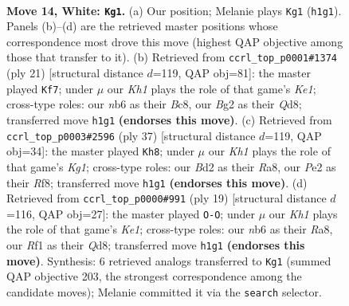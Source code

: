 \documentclass[11pt]{article}
\begin{document}
\begin{figure}[p]
\label{fig:thought-m24}
\end{figure}

\clearpage

\begin{figure}[p]\centering
\begin{subfigure}{0.46\textwidth}\centering
\resizebox{\linewidth}{!}{%
\newchessgame
\chessboard[
  setfen={r1b1kb1r/1pp5/1nn3p1/4p2p/p4P1q/2NP4/PP1BPPB1/R2QNR1K w kq - 0 14},
  showmover=false,
  pgfstyle=straightmove, color=movearrow, markmove={h1-g1}
]}
\caption{}
\end{subfigure}\hfill
\begin{subfigure}{0.46\textwidth}\centering
\resizebox{\linewidth}{!}{%
\newchessgame
\chessboard[
  setfen={r1bqk2r/ppp1n1pp/5n2/3P4/Q1p1p3/2P1N1P1/P3PP1P/R1B1KB1R b KQkq - 2 11},
  showmover=false,
  pgfstyle=straightmove, color=movearrow, markmove={e8-f7}
]}
\caption{}
\end{subfigure}
\\[4pt]
\begin{subfigure}{0.46\textwidth}\centering
\resizebox{\linewidth}{!}{%
\newchessgame
\chessboard[
  setfen={r4rk1/ppq1n1p1/2nb3p/3p1p1b/3P4/PQ3N1P/1P1BNPP1/RB2RK2 b - - 0 19},
  showmover=false,
  pgfstyle=straightmove, color=movearrow, markmove={g8-h8}
]}
\caption{}
\end{subfigure}\hfill
\begin{subfigure}{0.46\textwidth}\centering
\resizebox{\linewidth}{!}{%
\newchessgame
\chessboard[
  setfen={r1bqk2r/1p1n1ppp/1bp4n/p3p1N1/P1B1P3/1N5P/1PP2PP1/R1BQK2R b KQkq - 0 10},
  showmover=false,
  pgfstyle=straightmove, color=movearrow, markmove={e8-g8}
]}
\caption{}
\end{subfigure}
\caption{\textbf{Move 14, White: \texttt{Kg1}.} (a) Our position; Melanie plays \texttt{Kg1} (\texttt{h1g1}). Panels (b)--(d) are the retrieved master positions whose correspondence most drove this move (highest QAP objective among those that transfer to it). (b) Retrieved from \texttt{ccrl\_top\_p0001\#1374} (ply 21) [structural distance $d$=119, QAP obj=81]: the master played \texttt{Kf7}; under $\mu$ our \emph{Kh1} plays the role of that game's \emph{Ke1}; cross-type roles: our \emph{n}b6 as their \emph{B}c8, our \emph{B}g2 as their \emph{Q}d8; transferred move \texttt{h1g1} \textbf{(endorses this move)}. (c) Retrieved from \texttt{ccrl\_top\_p0003\#2596} (ply 37) [structural distance $d$=119, QAP obj=34]: the master played \texttt{Kh8}; under $\mu$ our \emph{Kh1} plays the role of that game's \emph{Kg1}; cross-type roles: our \emph{B}d2 as their \emph{R}a8, our \emph{P}e2 as their \emph{R}f8; transferred move \texttt{h1g1} \textbf{(endorses this move)}. (d) Retrieved from \texttt{ccrl\_top\_p0000\#991} (ply 19) [structural distance $d$=116, QAP obj=27]: the master played \texttt{O-O}; under $\mu$ our \emph{Kh1} plays the role of that game's \emph{Ke1}; cross-type roles: our \emph{n}b6 as their \emph{R}a8, our \emph{R}f1 as their \emph{Q}d8; transferred move \texttt{h1g1} \textbf{(endorses this move)}. Synthesis: 6 retrieved analogs transferred to \texttt{Kg1} (summed QAP objective 203, the strongest correspondence among the candidate moves); Melanie committed it via the \texttt{search} selector.}

\end{figure}
\end{document}
